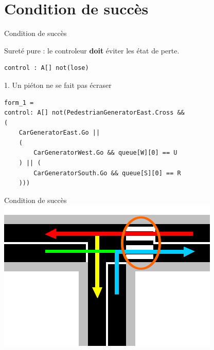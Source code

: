 \documentclass{bredelebeamer}
\begin{document}
\section{Condition de succès}
\begin{frame}[fragile]{Condition de succès}
\begin{alertblock}{}
Sureté pure : le controleur \textbf{doit} éviter les état de perte.
\begin{verbatim}
control : A[] not(lose)
\end{verbatim}
\end{alertblock}



\begin{block}{1. Un piéton ne se fait pas écraser}
\begin{verbatim}
form_1 = 
control: A[] not(PedestrianGeneratorEast.Cross && 
(
    CarGeneratorEast.Go || 
    (
        CarGeneratorWest.Go && queue[W][0] == U
    ) || (
        CarGeneratorSouth.Go && queue[S][0] == R
    )))
\end{verbatim}
\end{block}

\end{frame}
\begin{frame}[fragile]{Condition de succès}
\centering
\includegraphics[scale=0.8]{images/pietonCollision.png}

\end{frame}
\end{document}
